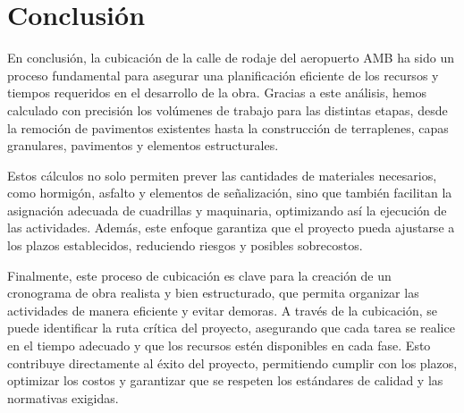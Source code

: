 \documentclass{article} %
\begin{document}
\newpage
\section{Conclusión}

En conclusión, la cubicación de la calle de rodaje del aeropuerto AMB ha sido un proceso fundamental para asegurar una planificación eficiente de los recursos y tiempos requeridos en el desarrollo de la obra. Gracias a este análisis, hemos calculado con precisión los volúmenes de trabajo para las distintas etapas, desde la remoción de pavimentos existentes hasta la construcción de terraplenes, capas granulares, pavimentos y elementos estructurales.

Estos cálculos no solo permiten prever las cantidades de materiales necesarios, como hormigón, asfalto y elementos de señalización, sino que también facilitan la asignación adecuada de cuadrillas y maquinaria, optimizando así la ejecución de las actividades. Además, este enfoque garantiza que el proyecto pueda ajustarse a los plazos establecidos, reduciendo riesgos y posibles sobrecostos.

Finalmente, este proceso de cubicación es clave para la creación de un cronograma de obra realista y bien estructurado, que permita organizar las actividades de manera eficiente y evitar demoras. A través de la cubicación, se puede identificar la ruta crítica del proyecto, asegurando que cada tarea se realice en el tiempo adecuado y que los recursos estén disponibles en cada fase. Esto contribuye directamente al éxito del proyecto, permitiendo cumplir con los plazos, optimizar los costos y garantizar que se respeten los estándares de calidad y las normativas exigidas.
\end{document}
